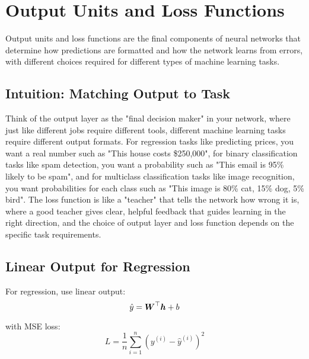
\section{Output Units and Loss Functions }
\label{sec:output-loss}

Output units and loss functions are the final components of neural networks that determine how predictions are formatted and how the network learns from errors, with different choices required for different types of machine learning tasks.

\subsection{Intuition: Matching Output to Task}

Think of the output layer as the "final decision maker" in your network, where just like different jobs require different tools, different machine learning tasks require different output formats. For regression tasks like predicting prices, you want a real number such as "This house costs \$250,000", for binary classification tasks like spam detection, you want a probability such as "This email is 95\% likely to be spam", and for multiclass classification tasks like image recognition, you want probabilities for each class such as "This image is 80\% cat, 15\% dog, 5\% bird". The loss function is like a "teacher" that tells the network how wrong it is, where a good teacher gives clear, helpful feedback that guides learning in the right direction, and the choice of output layer and loss function depends on the specific task requirements.

\subsection{Linear Output for Regression}

For regression, use linear output:
\begin{equation}
\hat{y} = \boldsymbol{W}^\top \boldsymbol{h} + b
\end{equation}

with MSE loss:
\begin{equation}
L = \frac{1}{n} \sum_{i=1}^{n} (y^{(i)} - \hat{y}^{(i)})^2
\end{equation}

